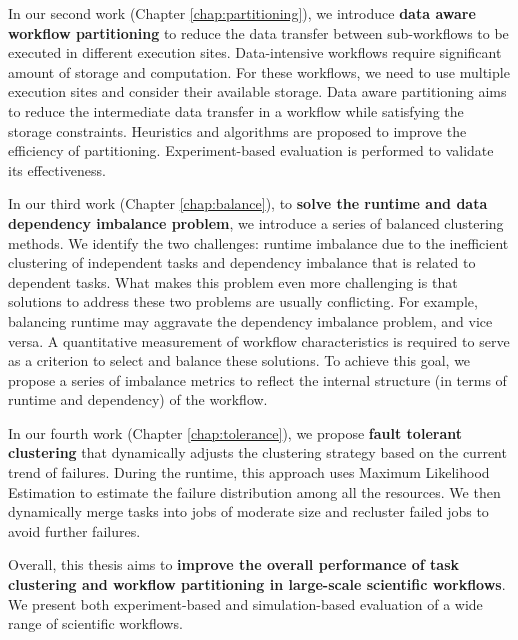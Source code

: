 In our second work \cite{Integration2012, Chen2011a} (Chapter \ref{chap:partitioning}), we introduce \textbf{data aware workflow partitioning} to reduce the data transfer between sub-workflows to be executed in different execution sites. Data-intensive workflows require significant amount of storage and computation. For these workflows, we need to use multiple execution sites and consider their available storage. Data aware partitioning aims to reduce the intermediate data transfer in a workflow while satisfying the storage constraints. Heuristics and algorithms are proposed to improve the efficiency of partitioning. Experiment-based evaluation is performed to validate its effectiveness.  

In our third work \cite{Chen2013a,Chen2013b} (Chapter \ref{chap:balance}), to \textbf{solve the runtime and data dependency imbalance problem}, we introduce a series of balanced clustering methods. 
We identify the two challenges: runtime imbalance due to the inefficient clustering of independent tasks and dependency imbalance that is related to dependent tasks. What makes this problem even more challenging is that solutions to address these two problems are usually conflicting. For example, balancing runtime may aggravate the dependency imbalance problem, and vice versa. A quantitative measurement of workflow characteristics is required to serve as a criterion to select and balance these solutions. To achieve this goal, we propose a series of imbalance metrics to reflect the internal structure (in terms of runtime and dependency) of the workflow. 

In our fourth work \cite{Chen2012} (Chapter \ref{chap:tolerance}), we propose \textbf{fault tolerant clustering} that dynamically adjusts the clustering strategy based on the current trend of failures. During the runtime, this approach uses Maximum Likelihood Estimation to estimate the failure distribution among all the resources. We then dynamically merge tasks into jobs of moderate size and recluster failed jobs to avoid further failures.


Overall, this thesis aims to \textbf{improve the overall performance of task clustering and workflow partitioning in large-scale scientific workflows}. We present both experiment-based and simulation-based evaluation of a wide range of scientific workflows. 



